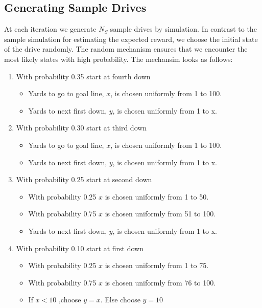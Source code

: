 \documentclass[11pt, oneside]{article}   	%
\begin{document}
\subsection{Generating Sample Drives}
At each iteration we generate $N_S$ sample drives by simulation. In contrast to the sample simulation for estimating the expected reward, we choose the initial state of the drive randomly. The random mechanism ensures that we encounter the most likely states with high probability. The mechansim looks as follows:
\begin{enumerate}
\item With probability 0.35 start at fourth down
\begin{itemize}
\item Yards to go to goal line, $x$, is chosen uniformly from 1 to 100.
\item Yards to next first down, $y$, is chosen uniformly from 1 to x.
\end{itemize}
\item With probability 0.30 start at third down
\begin{itemize}
\item Yards to go to goal line, $x$, is chosen uniformly from 1 to 100.
\item Yards to next first down, $y$, is chosen uniformly from 1 to x.
\end{itemize}
\item With probability 0.25 start at second down
\begin{itemize}
\item With probability 0.25 $x$ is chosen uniformly from 1 to 50.
\item With probability 0.75 $x$ is chosen uniformly from 51 to 100.
\item Yards to next first down, $y$, is chosen uniformly from 1 to x.
\end{itemize} 
\item With probability 0.10 start at first down
\begin{itemize}
\item With probability 0.25 $x$ is chosen uniformly from 1 to 75.
\item With probability 0.75 $x$ is chosen uniformly from 76 to 100.
\item If $x < 10$ ,choose $y=x$. Else choose $y=10$
\end{itemize}
\end{enumerate}
\end{document}
